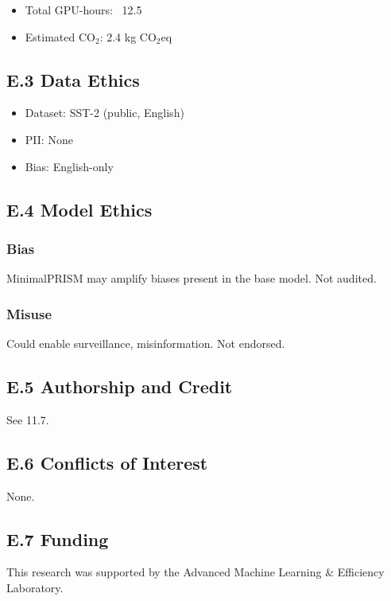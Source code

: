 \begin{itemize}
\item Total GPU-hours: ~12.5
\item Estimated CO$_2$: 2.4 kg CO$_2$eq

\end{itemize}
\subsection{E.3 Data Ethics}

\begin{itemize}
\item Dataset: SST-2 (public, English)
\item PII: None
\item Bias: English-only

\end{itemize}
\subsection{E.4 Model Ethics}

\subsubsection{Bias}

MinimalPRISM may amplify biases present in the base model. Not audited.

\subsubsection{Misuse}

Could enable surveillance, misinformation. Not endorsed.

\subsection{E.5 Authorship and Credit}

See  11.7.

\subsection{E.6 Conflicts of Interest}

None.

\subsection{E.7 Funding}

This research was supported by the Advanced Machine Learning \& Efficiency Laboratory.

